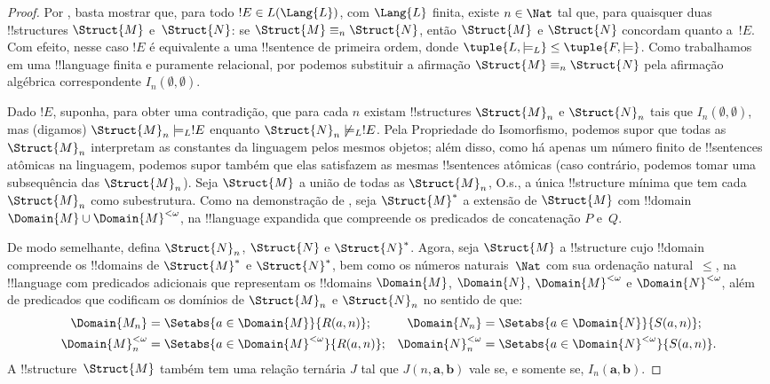 \documentclass[../../../include/open-logic-section]{subfiles}
\begin{document}
\begin{proof}
Por , basta mostrar que, para todo
$!E \in L(\Lang{L})$, com $\Lang{L}$ finita, existe $n \in \Nat$ tal
que, para quaisquer duas !!{structure}s $\Struct{M}$ e~$\Struct{N}$:
se $\Struct{M} \equiv_n \Struct{N}$, então $\Struct{M}$ e $\Struct{N}$
concordam quanto a~$!E$. Com efeito, nesse caso $!E$ é equivalente a
uma !!{sentence} de primeira ordem, donde
$\tuple{L, \models_L} \le \tuple{F, \models}$. Como trabalhamos em uma
!!{language} finita e puramente relacional, por
 podemos substituir a afirmação
$\Struct{M} \equiv_n \Struct{N}$ pela afirmação algébrica
correspondente $I_n(\emptyset,\emptyset)$.

Dado $!E$, suponha, para obter uma contradição, que para cada $n$
existam !!{structure}s $\Struct{M}_n$ e $\Struct{N}_n$ tais que
$I_n(\emptyset, \emptyset)$, mas (digamos)
$\Struct{M}_n \models_L !E$ enquanto
$\Struct{N}_n \not\models_L !E$. Pela Propriedade do Isomorfismo,
podemos supor que todas as $\Struct{M}_n$ interpretam as constantes da
linguagem pelos mesmos objetos; além disso, como há apenas um número
finito de !!{sentence}s atômicas na linguagem, podemos supor também
que elas satisfazem as mesmas !!{sentence}s atômicas (caso contrário,
podemos tomar uma subsequência das $\Struct{M}_n$). Seja $\Struct{M}$ a
união de todas as $\Struct{M}_n$, O.s.\@, a única !!{structure} mínima
que tem cada $\Struct{M}_n$ como subestrutura. Como na demonstração de
, seja $\Struct{M}^*$ a extensão de
$\Struct{M}$ com !!{domain}
$\Domain{M} \cup \Domain{M}^{<\omega}$, na !!{language} expandida que
compreende os predicados de concatenação $P$ e~$Q$.

De modo semelhante, defina $\Struct{N}_n$, $\Struct{N}$ e
$\Struct{N}^*$. Agora, seja $\Struct{M}$ a !!{structure} cujo
!!{domain} compreende os !!{domain}s de $\Struct{M}^*$ e
$\Struct{N}^*$, bem como os números naturais~$\Nat$ com sua ordenação
natural~$\le$, na !!{language} com predicados adicionais que
representam os !!{domain}s $\Domain{M}$, $\Domain{N}$,
$\Domain{M}^{<\omega}$ e $\Domain{N}^{<\omega}$, além de predicados que
codificam os domínios de $\Struct{M}_n$ e $\Struct{N}_n$ no sentido de
que:
\begin{align*}
  \Domain{M_n} & = \Setabs{a \in \Domain{M}}{R(a, n)}; & 
  \Domain{N_n} & = \Setabs{a \in \Domain{N}}{S(a,n)}; \\
  \Domain{M}^{<\omega}_n & = \Setabs{a \in \Domain{M}^{<\omega}}{R(a,n)}; &
  \Domain{N}^{<\omega}_n & = \Setabs{a \in \Domain{N}^{<\omega}}{S(a,n)}. 
\end{align*}
A !!{structure}~$\Struct{M}$ também tem uma relação ternária $J$ tal
que $J(n, \mathbf{a}, \mathbf{b})$ vale se, e somente se,
$I_n(\mathbf{a}, \mathbf{b})$.


\end{proof}
\end{document}
